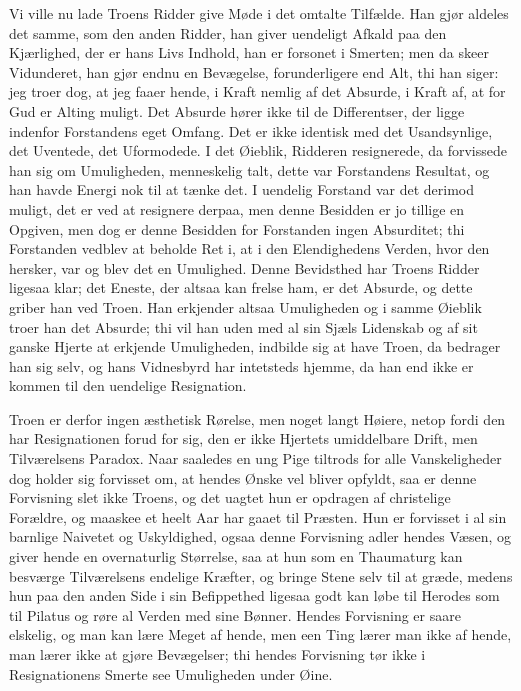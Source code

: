 \documentclass[12pt,a4paper]{article}
\begin{document}
Vi ville nu lade Troens Ridder give Møde i det omtalte Tilfælde. Han gjør aldeles det samme, som den anden Ridder, han giver uendeligt Afkald paa den Kjærlighed, der er hans Livs Indhold, han er forsonet i Smerten; men da skeer Vidunderet, han gjør endnu en Bevægelse, forunderligere end Alt, thi han siger: jeg troer dog, at jeg faaer hende, i Kraft nemlig af det Absurde, i Kraft af, at for Gud er Alting muligt. Det Absurde hører ikke til de Differentser, der ligge indenfor Forstandens eget Omfang. Det er ikke identisk med det Usandsynlige, det Uventede, det Uformodede. I det Øieblik, Ridderen resignerede, da forvissede han sig om Umuligheden, menneskelig talt, dette var Forstandens Resultat, og han havde Energi nok til at tænke det. I uendelig Forstand var det derimod muligt, det er ved at resignere derpaa, men denne Besidden er jo tillige en Opgiven, men dog er denne Besidden for Forstanden ingen Absurditet; thi Forstanden vedblev at beholde Ret i, at i den Elendighedens Verden, hvor den hersker, var og blev det en Umulighed. Denne Bevidsthed har Troens Ridder ligesaa klar; det Eneste, der altsaa kan frelse ham, er det Absurde, og dette griber han ved Troen. Han erkjender altsaa Umuligheden og i samme Øieblik troer han det Absurde; thi vil han uden med al sin Sjæls Lidenskab og af sit ganske Hjerte at erkjende Umuligheden, indbilde sig at have Troen, da bedrager han sig selv, og hans Vidnesbyrd har intetsteds hjemme, da han end ikke er kommen til den uendelige Resignation.

Troen er derfor ingen æsthetisk Rørelse, men noget langt Høiere, netop fordi den har Resignationen forud for sig, den er ikke Hjertets umiddelbare Drift, men Tilværelsens Paradox. Naar saaledes en ung Pige tiltrods for alle Vanskeligheder dog holder sig forvisset om, at hendes Ønske vel bliver opfyldt, saa er denne Forvisning slet ikke Troens, og det uagtet hun er opdragen af christelige Forældre, og maaskee et heelt Aar har gaaet til Præsten. Hun er forvisset i al sin barnlige Naivetet og Uskyldighed, ogsaa denne Forvisning adler hendes Væsen, og giver hende en overnaturlig Størrelse, saa at hun som en Thaumaturg kan besværge Tilværelsens endelige Kræfter, og bringe Stene selv til at græde, medens hun paa den anden Side i sin Befippethed ligesaa godt kan løbe til Herodes som til Pilatus og røre al Verden med sine Bønner. Hendes Forvisning er saare elskelig, og man kan lære Meget af hende, men een Ting lærer man ikke af hende, man lærer ikke at gjøre Bevægelser; thi hendes Forvisning tør ikke i Resignationens Smerte see Umuligheden under Øine.
\end{document}
